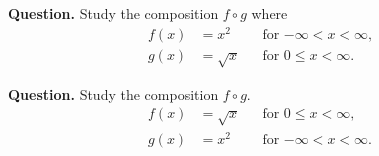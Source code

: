 \documentclass[10pt,t,presentation,ignorenonframetext,aspectratio=169]{beamer}
\begin{document}
\begin{frame}
  \vs
  \textbf{Question.} Study the composition $f \circ g$ where
  \begin{align*}
    f(x)&=x^2 &&\text{for $-\infty< x< \infty$,}\\
    g(x)&= \sqrt{x} &&\text{for $0\le x< \infty$.}
  \end{align*}
  \vfill
\end{frame}

\begin{frame}
  \vs
  \textbf{Question.} Study the composition $f \circ g$.
  \begin{align*}
    f(x)&=\sqrt{x} &&\text{for $0\le x< \infty$,}\\
    g(x)&= x^2 &&\text{for $-\infty< x< \infty$.}
  \end{align*}
  \vfill
\end{frame}
\end{document}
